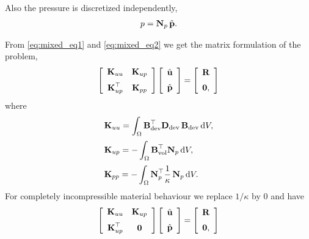 Also the pressure is discretized independently,
\begin{equation*}
  \begin{array}{lll}
    p = \textbf{N}_p\,\hat{\textbf{p}}.
  \end{array}
\end{equation*}

From \eqref{eq:mixed_eq1} and \eqref{eq:mixed_eq2} we get the matrix formulation of the problem,
\begin{equation*}
  \begin{array}{lll}
    \left[\begin{array}{cc}
      \textbf{K}_{uu} & \textbf{K}_{up}\\[2mm]
      \textbf{K}_{up}^\top & \textbf{K}_{pp}
    \end{array}\right]
    \left[\begin{array}{c}
      \hat{\textbf{u}}\\[2mm]
      \hat{\textbf{p}}
    \end{array}\right] = 
    \left[\begin{array}{c}
      \textbf{R}\\[2mm]
      \textbf{0},
    \end{array}\right] 
  \end{array}
\end{equation*}
where
\begin{equation*}
  \begin{array}{lll}
    \bfK_{uu} = \ds\int_{\Omega} \bfB_\text{dev}^\top \bfD_\text{dev} \,\bfB_\text{dev} \,\d V,\\[4mm]
    \bfK_{up} = -\ds\int_{\Omega} \bfB_\text{vol}^\top \bfN_p \,\d V,\\[4mm]
    \bfK_{pp} = -\ds\int_{\Omega} \bfN_p^\top\dfrac1{\kappa} \bfN_p \,\d V.
  \end{array}
\end{equation*}
For completely incompressible material behaviour we replace $1/\kappa$ by $0$ and have
\begin{equation*}
  \begin{array}{lll}
    \left[\begin{array}{cc}
      \textbf{K}_{uu} & \textbf{K}_{up}\\[2mm]
      \textbf{K}_{up}^\top & \textbf{0}
    \end{array}\right]
    \left[\begin{array}{c}
      \hat{\textbf{u}}\\[2mm]
      \hat{\textbf{p}}
    \end{array}\right] = 
    \left[\begin{array}{c}
      \textbf{R}\\[2mm]
      \textbf{0},
    \end{array}\right]
  \end{array}
\end{equation*}

